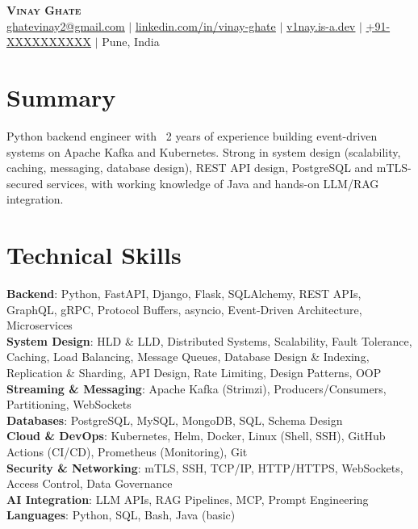 \documentclass[a4paper,11pt]{article}
\makeatletter
\newcommand{\emailAddr}{ghatevinay2@gmail.com}
\newcommand{\linkedinUrl}{https://linkedin.com/in/vinay-ghate}
\newcommand{\portfolioUrl}{https://v1nay.is-a.dev}
\providecommand{\phoneNumber}{+91-XXXXXXXXXX}
\makeatother
\begin{document}
\begin{center}
    \textbf{\Huge \scshape Vinay Ghate} \\ \vspace{4pt}
    \small \href{mailto:\emailAddr}{\underline{\emailAddr}} $|$
    \href{\linkedinUrl}{\underline{linkedin.com/in/vinay-ghate}} $|$
    \href{\portfolioUrl}{\underline{v1nay.is-a.dev}} $|$
    \href{tel:\phoneNumber}{\phoneNumber} $|$
    Pune, India
\end{center}

\section{Summary}
\small{Python backend engineer with ~2 years of experience building event-driven systems on Apache Kafka and Kubernetes. Strong in system design (scalability, caching, messaging, database design), REST API design, PostgreSQL and mTLS-secured services, with working knowledge of Java and hands-on LLM/RAG integration.}

\section{Technical Skills}
 \begin{itemize}[leftmargin=0.15in, label={}]
    \small{\item{
     \textbf{Backend}{: Python, FastAPI, Django, Flask, SQLAlchemy, REST APIs, GraphQL, gRPC, Protocol Buffers, asyncio, Event-Driven Architecture, Microservices} \\
     \textbf{System Design}{: HLD \& LLD, Distributed Systems, Scalability, Fault Tolerance, Caching, Load Balancing, Message Queues, Database Design \& Indexing, Replication \& Sharding, API Design, Rate Limiting, Design Patterns, OOP} \\
     \textbf{Streaming \& Messaging}{: Apache Kafka (Strimzi), Producers/Consumers, Partitioning, WebSockets} \\
     \textbf{Databases}{: PostgreSQL, MySQL, MongoDB, SQL, Schema Design} \\
     \textbf{Cloud \& DevOps}{: Kubernetes, Helm, Docker, Linux (Shell, SSH), GitHub Actions (CI/CD), Prometheus (Monitoring), Git} \\
     \textbf{Security \& Networking}{: mTLS, SSH, TCP/IP, HTTP/HTTPS, WebSockets, Access Control, Data Governance} \\
     \textbf{AI Integration}{: LLM APIs, RAG Pipelines, MCP, Prompt Engineering} \\
     \textbf{Languages}{: Python, SQL, Bash, Java (basic)}
    }}
 \end{itemize}
\end{document}
